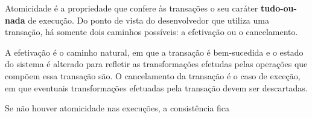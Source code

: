 \documentclass[11pt,twoside,a4paper]{book}
\begin{document}
Atomicidade é a propriedade que confere às transações o seu caráter \textbf{tudo-ou-nada} de execução. Do ponto de vista do desenvolvedor que utiliza uma transação, há somente dois caminhos possíveis: a efetivação ou o cancelamento.

A efetivação é o caminho natural, em que a transação é bem-sucedida e o estado do sistema é alterado para refletir as transformações efetudas pelas operações que compõem essa transação são. O cancelamento da transação é o caso de exceção, em que eventuais transformações efetuadas pela transação devem ser descartadas.

Se não houver atomicidade nas execuções, a consistência fica






\end{document}
